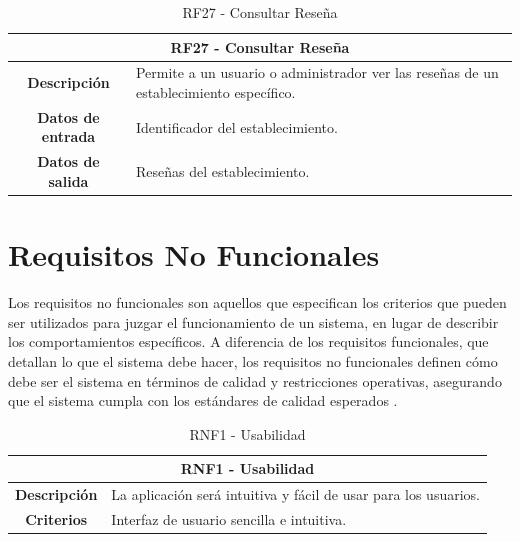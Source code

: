 \begin{table}[H]
    \centering
    \begin{tabular}{|c|p{10cm}|}
        \hline
        \multicolumn{2}{|c|}{\textbf{RF27 - Consultar Reseña}}                                                             \\
        \hline
        \textbf{Descripción}      & Permite a un usuario o administrador ver las reseñas de un establecimiento específico. \\
        \hline
        \textbf{Datos de entrada} & Identificador del establecimiento.                                                     \\
        \hline
        \textbf{Datos de salida}  & Reseñas del establecimiento.                                                           \\
        \hline
    \end{tabular}
    \caption{RF27 - Consultar Reseña}
\end{table}

\section{Requisitos No Funcionales}

Los requisitos no funcionales son aquellos que especifican los criterios que pueden ser utilizados para juzgar el funcionamiento de un sistema, en lugar de describir los comportamientos específicos. A diferencia de los requisitos funcionales, que detallan lo que el sistema debe hacer, los requisitos no funcionales definen cómo debe ser el sistema en términos de calidad y restricciones operativas, asegurando que el sistema cumpla con los estándares de calidad esperados \cite{glinz} \cite{chung} \cite{gross}.

\begin{table}[H]
    \centering
    \begin{tabular}{|c|p{10cm}|}
        \hline
        \multicolumn{2}{|c|}{\textbf{RNF1 - Usabilidad}}                                       \\
        \hline
        \textbf{Descripción} & La aplicación será intuitiva y fácil de usar para los usuarios. \\
        \hline
        \textbf{Criterios}   & Interfaz de usuario sencilla e intuitiva.                       \\
        \hline
    \end{tabular}
    \caption{RNF1 - Usabilidad}
\end{table}

